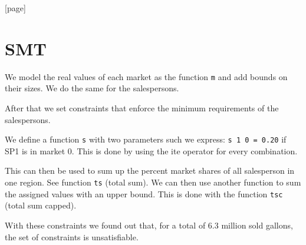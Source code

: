 \documentclass{base}
\begin{document}


[page]
\newcommand{\tikzhighlightanchor}[1]{\ensuremath{\vcenter{\hbox{\tikz[remember picture, overlay]{\coordinate (#1 highlight \arabic{highlight});}}}}}
\newcommand{\bh}[0]{\stepcounter{highlight}\tikzhighlightanchor{begin}}
\newcommand{\eh}[0]{\tikzhighlightanchor{end}}


\section*{SMT}

We model the real values of each market as the function \verb|m| and add bounds on their sizes.
We do the same for the salespersons.

After that we set constraints that enforce the minimum requirements of the salespersons.

We define a function \verb|s| with two parameters such we express: \verb|s 1 0 = 0.20| if SP1 is in market 0. This is done by using the ite operator for every combination.

This can then be used to sum up the percent market shares of all salesperson in one region. See function \verb|ts| (total sum).
We can then use another function to sum the assigned values with an upper bound. This is done with the function \verb|tsc| (total sum capped).





With these constraints we found out that, for a total of 6.3 million sold gallons, the set of constraints is unsatisfiable.
\end{document}
